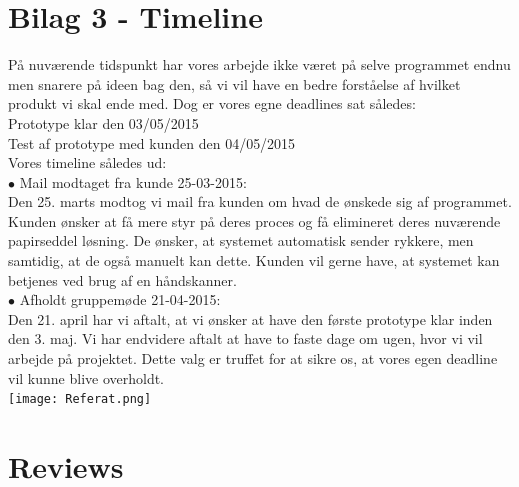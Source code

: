 \documentclass[a4paper]{article}
\begin{document}
\section{Bilag 3 - Timeline}
På nuværende tidspunkt har vores arbejde ikke været på selve programmet endnu men snarere på ideen bag den, så vi vil have en bedre forståelse af hvilket produkt vi skal ende med. Dog er vores egne deadlines sat således:\\
Prototype klar den 03/05/2015 \\
Test af prototype med kunden den 04/05/2015\\
Vores timeline således ud:\\
$\bullet$ Mail modtaget fra kunde 25-03-2015:\\
Den 25. marts modtog vi mail fra kunden om hvad de ønskede sig af programmet. Kunden ønsker at få mere styr på deres proces og få elimineret deres nuværende papirseddel løsning. De ønsker, at systemet automatisk sender rykkere, men samtidig, at de også manuelt kan dette. Kunden vil gerne have, at systemet kan betjenes ved brug af en håndskanner.\\
$\bullet$ Afholdt gruppemøde 21-04-2015:\\
Den 21. april har vi aftalt, at vi ønsker at have den første prototype klar inden den 3. maj. Vi har endvidere aftalt at have to faste dage om ugen, hvor vi vil arbejde på projektet. Dette valg er truffet for at sikre os, at vores egen deadline vil kunne blive overholdt.\\
\pagebreak
\texttt{[image: Referat.png]} 
\section{Reviews}
\end{document}
